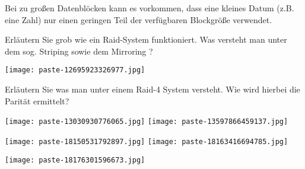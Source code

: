 \documentclass{article}
\begin{document}
\begin{tcolorbox}[colback=white!10!white,colframe=lightgray!75!black,
  savelowerto=\jobname_ex.tex]

\begin{center}
Bei zu großen Datenblöcken kann es vorkommen, dass eine kleines Datum (z.B. eine Zahl) nur einen geringen Teil der verfügbaren Blockgröße verwendet.

\end{center}

\tcblower

\justifying

\end{tcolorbox}
\begin{tcolorbox}[colback=white!10!white,colframe=lightgray!75!black,
  savelowerto=\jobname_ex.tex]

\begin{center}
 Erläutern Sie grob wie ein Raid-System funktioniert. Was versteht man unter dem sog. 
Striping
sowie dem 
Mirroring
? 

\end{center}

\tcblower

\justifying
\texttt{[image: paste-12695923326977.jpg]}

\end{tcolorbox}
\begin{tcolorbox}[colback=white!10!white,colframe=lightgray!75!black,
  savelowerto=\jobname_ex.tex]

\begin{center}
 Erläutern Sie was man unter einem 
Raid-4 System
versteht. Wie wird hierbei die Parität ermittelt? 

\end{center}

\tcblower

\justifying
\texttt{[image: paste-13030930776065.jpg]}
\texttt{[image: paste-13597866459137.jpg]}

\end{tcolorbox}
\begin{tcolorbox}[colback=white!10!white,colframe=lightgray!75!black,
  savelowerto=\jobname_ex.tex]

\begin{center}
 
\texttt{[image: paste-18150531792897.jpg]}
\texttt{[image: paste-18163416694785.jpg]}
 

\end{center}

\tcblower

\justifying
\texttt{[image: paste-18176301596673.jpg]}

\end{tcolorbox}
\end{document}
